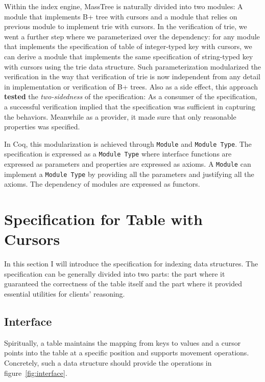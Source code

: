 \documentclass[runningheads]{llncs}
\begin{document}
Within the index engine, MassTree is naturally divided into two modules: A
module that implements B+ tree with cursors and a module that relies on previous
module to implement trie with cursors. In the verification of trie, we went a
further step where we parameterized over the dependency: for any module that
implements the specification of table of integer-typed key with
cursors, we can derive a module that implements the same specification of
string-typed key with cursors using the trie data structure. Such
parameterization modularized the verification in the way that verification of
trie is now independent from any detail in implementation or verification of B+
trees. Also as a side effect, this approach \textbf{tested} the
\textit{two-sidedness} of the specification: As a consumer of the specification,
a successful verification implied that the specification was sufficient in
capturing the behaviors. Meanwhile as a provider, it made sure that only
reasonable properties was specified.

In Coq, this modularization is achieved through \texttt{Module} and
\texttt{Module Type}. The specification is expressed as a \texttt{Module Type}
where interface functions are expressed as parameters and properties are
expressed as axioms. A \texttt{Module} can implement a \texttt{Module Type} by
providing all the parameters and justifying all the axioms. The dependency of
modules are expressed as functors.

\section{Specification for Table with Cursors}\label{spec}

In this section I will introduce the specification for indexing data
structures. The specification can be generally divided into two parts: the part
where it guaranteed the correctness of the table itself and the part where it
provided essential utilities for clients' reasoning.

\subsection{Interface}

Spiritually, a table maintains the mapping from keys to values and a cursor
points into the table at a specific position and supports movement operations.
Concretely, such a data structure should provide the operations in
figure~\ref{fig:interface}.
\end{document}
